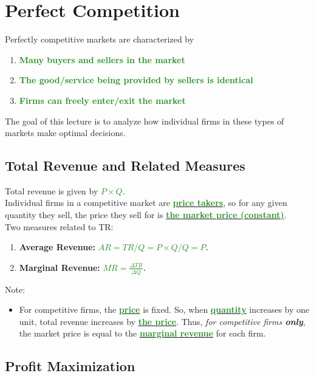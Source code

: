 \documentclass[11pt]{article}\usepackage[]{graphicx}\usepackage[]{color}
\theoremstyle{definition}
\newcommand{\ddp}[1]{{\textbf{\textcolor{ForestGreen}{#1}}}}
\newcommand{\dd}[1]{{\underline{\textbf{\textcolor{ForestGreen}{#1}}}}}
\begin{document}
\newpage
	
	\section{Perfect Competition}
	
	Perfectly competitive markets are characterized by
	\begin{enumerate}
		\itemsep1em
		\item \ddp{Many buyers and sellers in the market}
		\item \ddp{The good/service being provided by sellers is identical}
		\item \ddp{Firms can freely enter/exit the market}
	\end{enumerate}
	\vspace{2pt}
	
	The goal of this lecture is to analyze how individual firms in these types of markets make optimal decisions.

	
	\subsection{Total Revenue and Related Measures}
	
	Total revenue is given by \dd{$P\times Q$}.
	\\
	
	Individual firms in a competitive market are \dd{price takers}, so for any given quantity they sell, the price they sell for is \dd{the market price (constant)}.
	\\
	
	Two measures related to TR:
	\begin{enumerate}
		\itemsep1em
		\item \textbf{Average Revenue:} \ddp{$AR = TR/Q = P\times Q/Q = P$.}
		\item \textbf{Marginal Revenue:} \ddp{$MR = \frac{\Delta TR}{\Delta Q}$.}
	\end{enumerate}
	
	Note:
	\begin{itemize}
		\item For competitive firms, the \dd{price} is fixed. So, when \dd{quantity} increases by one unit, total revenue increases by \dd{the price}. Thus, \textit{for competitive firms \textbf{only}}, the market price is equal to the \dd{marginal revenue} for each firm.
	\end{itemize}
	
	\subsection{Profit Maximization}
	
\end{document}
